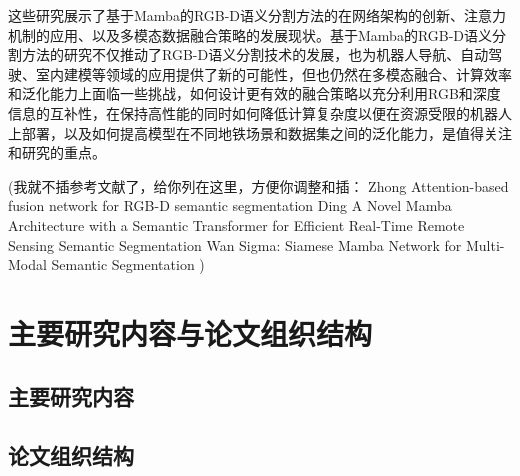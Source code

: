 这些研究展示了基于Mamba的RGB-D语义分割方法的在网络架构的创新、注意力机制的应用、以及多模态数据融合策略的发展现状。基于Mamba的RGB-D语义分割方法的研究不仅推动了RGB-D语义分割技术的发展，也为机器人导航、自动驾驶、室内建模等领域的应用提供了新的可能性，但也仍然在多模态融合、计算效率和泛化能力上面临一些挑战，如何设计更有效的融合策略以充分利用RGB和深度信息的互补性，在保持高性能的同时如何降低计算复杂度以便在资源受限的机器人上部署，以及如何提高模型在不同地铁场景和数据集之间的泛化能力，是值得关注和研究的重点。

(我就不插参考文献了，给你列在这里，方便你调整和插：
Zhong   Attention-based fusion network for RGB-D semantic segmentation
Ding    A Novel Mamba Architecture with a Semantic Transformer for Efficient Real-Time Remote Sensing Semantic Segmentation
Wan    Sigma: Siamese Mamba Network for Multi-Modal Semantic Segmentation
)



\section{主要研究内容与论文组织结构}


\subsection{主要研究内容}

\subsection{论文组织结构}




